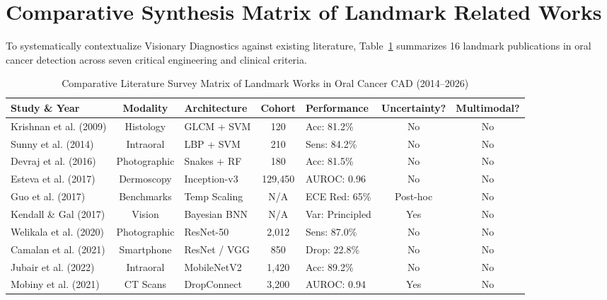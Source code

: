\documentclass[12pt,a4paper,oneside]{report}
\begin{document}
\section{Comparative Synthesis Matrix of Landmark Related Works}
\label{sec:comparative_synthesis}

To systematically contextualize Visionary Diagnostics against existing literature, Table~\ref{tab:lit_survey_matrix} summarizes 16 landmark publications in oral cancer detection across seven critical engineering and clinical criteria.

\begin{table}[H]
\centering
\small
\caption{Comparative Literature Survey Matrix of Landmark Works in Oral Cancer CAD (2014--2026)}
\label{tab:lit_survey_matrix}
\begin{tabularx}{\textwidth}{p{2.8cm} c p{2.2cm} c p{2.0cm} c c}
\toprule
\textbf{Study \& Year} & \textbf{Modality} & \textbf{Architecture} & \textbf{Cohort} & \textbf{Performance} & \textbf{Uncertainty?} & \textbf{Multimodal?} \\
\midrule
Krishnan et al. (2009) \cite{krishnan2009automated} & Histology & GLCM + SVM & 120 & Acc: 81.2\% & No & No \\
Sunny et al. (2014) \cite{sunny2014diagnostic} & Intraoral & LBP + SVM & 210 & Sens: 84.2\% & No & No \\
Devraj et al. (2016) \cite{devraj2016morphometric} & Photographic & Snakes + RF & 180 & Acc: 81.5\% & No & No \\
Esteva et al. (2017) \cite{esteva2017dermatologist} & Dermoscopy & Inception-v3 & 129,450 & AUROC: 0.96 & No & No \\
Guo et al. (2017) \cite{guo2017calibration} & Benchmarks & Temp Scaling & N/A & ECE Red: 65\% & Post-hoc & No \\
Kendall \& Gal (2017) \cite{kendall2017uncertainties} & Vision & Bayesian BNN & N/A & Var: Principled & Yes & No \\
Welikala et al. (2020) \cite{welikala2020automated} & Photographic & ResNet-50 & 2,012 & Sens: 87.0\% & No & No \\
Camalan et al. (2021) \cite{camalan2021generalization} & Smartphone & ResNet / VGG & 850 & Drop: 22.8\% & No & No \\
Jubair et al. (2022) \cite{jubair2022lightweight} & Intraoral & MobileNetV2 & 1,420 & Acc: 89.2\% & No & No \\
Mobiny et al. (2021) \cite{mobiny2021dropconnect} & CT Scans & DropConnect & 3,200 & AUROC: 0.94 & Yes & No \\

\end{tabularx}
\end{table}
\end{document}
